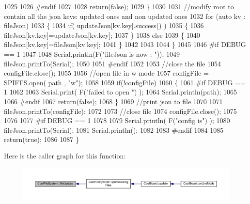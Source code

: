 \begin{DoxyCode}
1025 
1026 \textcolor{preprocessor}{    #endif}
1027 
1028         \textcolor{keywordflow}{return}(\textcolor{keyword}{false});
1029     \}
1030     
1031     \textcolor{comment}{//modify root to contain all the json keys: updated ones and non updated ones}
1032     \textcolor{keywordflow}{for} (\textcolor{keyword}{auto} kv : fileJson) 
1033     \{
1034         \textcolor{keywordflow}{if}( updateJson[kv.key].success() )
1035         \{
1036             fileJson[kv.key]=updateJson[kv.key];            
1037         \}
1038         \textcolor{keywordflow}{else}
1039         \{
1040             fileJson[kv.key]=fileJson[kv.key];
1041         \}
1042 
1043                 
1044     \}
1045 
1046 \textcolor{preprocessor}{#if DEBUG == 1}
1047 
1048     Serial.println(F(\textcolor{stringliteral}{"fileJson is now : "}));
1049     fileJson.printTo(Serial);
1050 
1051 \textcolor{preprocessor}{#endif}
1052 
1053     \textcolor{comment}{//close the file}
1054     configFile.close();
1055 
1056     \textcolor{comment}{//open file in w mode}
1057     configFile = SPIFFS.open( path , \textcolor{stringliteral}{"w"});
1058     
1059     \textcolor{keywordflow}{if}(!configFile)
1060     \{   
1061 \textcolor{preprocessor}{    #if DEBUG == 1}
1062         
1063         Serial.print( F(\textcolor{stringliteral}{"failed to open "}) );
1064         Serial.println(path);
1065 
1066 \textcolor{preprocessor}{    #endif}
1067         \textcolor{keywordflow}{return}(\textcolor{keyword}{false});
1068     \}
1069     \textcolor{comment}{//print json to file    }
1070     
1071     fileJson.printTo(configFile);
1072     
1073     \textcolor{comment}{//close file}
1074     configFile.close();
1075 
1076 
1077 \textcolor{preprocessor}{#if DEBUG == 1}
1078 
1079     Serial.println( F(\textcolor{stringliteral}{"config is"}) );
1080     fileJson.printTo(Serial);
1081     Serial.println();
1082 
1083 \textcolor{preprocessor}{#endif}
1084     
1085     \textcolor{keywordflow}{return}(\textcolor{keyword}{true});
1086     
1087 \}
\end{DoxyCode}
Here is the caller graph for this function\+:\nopagebreak
\begin{figure}[H]
\begin{center}
\leavevmode
\includegraphics[width=350pt]{db/d0c/class_cool_file_system_a13f2958f5b87757c31fc53797a30d23a_icgraph}
\end{center}
\end{figure}
\mbox{\label{class_cool_file_system_a70701d05e811604af1b531f4f6dc69ed}} 
